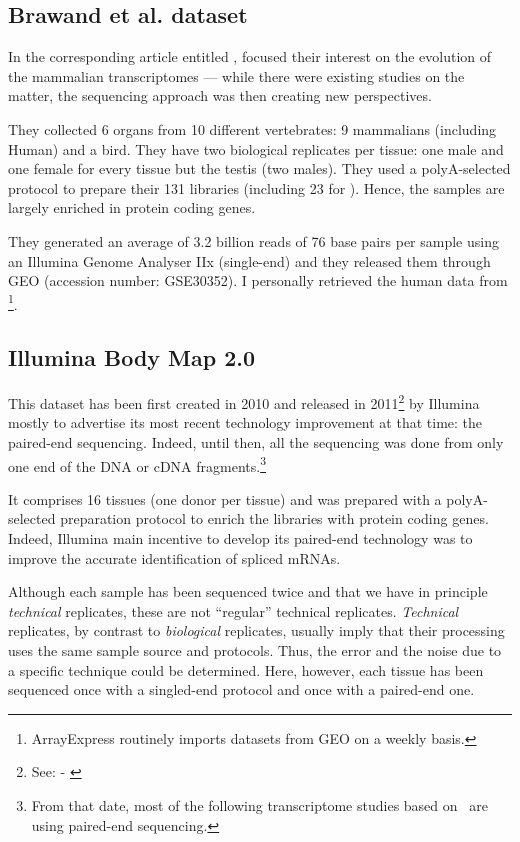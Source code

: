 \subsection{Brawand et al. dataset}

In the corresponding article entitled ,
\citet{VTpaper} focused their interest on the
evolution of the mammalian transcriptomes --- while there were existing studies
on the matter, the sequencing approach was then creating new perspectives.

They collected 6 organs from 10 different vertebrates:
9 mammalians (including Human) and a bird. They have two biological replicates
per tissue: one male and one female for every tissue but the testis (two males).
They used a polyA-selected protocol to prepare their 131 libraries (including 23
for ).
Hence, the samples are largely enriched in protein coding genes.

They generated an average of 3.2 billion reads of 76 base pairs per sample
using an Illumina Genome Analyser IIx (single-end) and they released them
through \gls{GEO} (accession number: GSE30352).
I personally retrieved the human data from
\footnote{ArrayExpress routinely imports
datasets from \gls{GEO} on a weekly basis.}.


\subsection{Illumina Body Map 2.0}
This dataset has been first created in 2010 and released in
2011\footnote{See:  - \cite{ibmEnsembl}} by Illumina
mostly to advertise its most recent technology improvement at that time:
the paired-end sequencing. Indeed, until then, all the sequencing was done
from only one end of the \gls{DNA} or \gls{cDNA} fragments.\footnote{From that
date, most of the following transcriptome studies based on \Rnaseq\ are using
paired-end sequencing.}

It comprises 16 tissues (one donor per tissue) and was prepared with a
polyA-selected preparation protocol to enrich the libraries with protein
coding genes. Indeed, Illumina main incentive to develop its paired-end
technology was to improve the accurate identification of spliced \glspl{mRNA}.

Although each sample has been sequenced twice and that we have in principle
\emph{technical} replicates, these are not ``regular'' technical replicates.
\emph{Technical} replicates,
by contrast to \emph{biological} replicates,
usually imply that their processing uses the same sample source and protocols.
Thus, the error and the noise due to a specific technique could be determined.
Here, however, each tissue has been sequenced once with a singled-end protocol
and once with a paired-end one.

